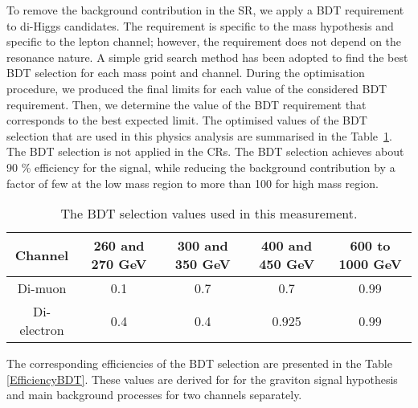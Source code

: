 To remove the background contribution in the SR, we apply a BDT requirement to di-Higgs candidates.  The requirement is specific to the mass hypothesis and specific to the lepton channel; however, the requirement does not depend on the resonance nature. A simple grid search method has been adopted to find the best BDT selection for each mass point and channel. During the optimisation procedure, we produced the final limits for each value of the considered BDT requirement. Then, we determine the value of the BDT requirement that corresponds to the best expected limit. The optimised values of the BDT selection that are used in this physics analysis are summarised in the Table~\ref{suboptCut}. The BDT selection is not applied in the CRs. The BDT selection achieves about 90 \% efficiency for the signal, while reducing the background contribution by a factor of few at the low mass region to more than 100 for high mass region.

\begin{table}
\begin{center} 
  \caption{The BDT selection values used in this measurement.}
 \begin{tabular}{ |c|c|c|c|c| } \hline%
   Channel & 260 and 270 GeV & 300 and 350 GeV & 400 and 450 GeV & 600 to 1000 GeV \\ \hline
   Di-muon & 0.1 & 0.7 & 0.7 & 0.99 \\ %
   Di-electron & 0.4 & 0.4 & 0.925 & 0.99\\ \hline%
  \end{tabular}
  \label{suboptCut}
\end{center}   
\end{table}

The corresponding efficiencies of the BDT selection are presented in the Table \ref{EfficiencyBDT}. These values are derived for for the graviton signal hypothesis and main background processes for two channels separately. 

